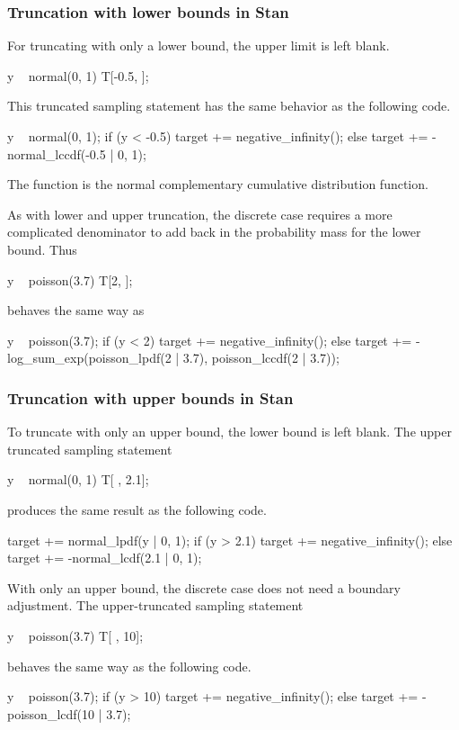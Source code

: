 \subsubsection{Truncation with lower bounds in Stan}

For truncating with only a lower bound, the upper limit is left blank.
%
\begin{stancode}
y ~ normal(0, 1) T[-0.5, ];
\end{stancode}
%
This truncated sampling statement has the same behavior as the
following code.
%
\begin{stancode}
y ~ normal(0, 1);
if (y < -0.5)
  target += negative_infinity();
else
  target += -normal_lccdf(-0.5 | 0, 1);
\end{stancode}
%
The  function is the normal complementary cumulative
distribution function.

As with lower and upper truncation, the discrete case requires a more
complicated denominator to add back in the probability mass for the
lower bound.  Thus
%
\begin{stancode}
y ~ poisson(3.7) T[2, ];
\end{stancode}
%
behaves the same way as
%
\begin{stancode}
y ~ poisson(3.7);
if (y < 2)
  target += negative_infinity();
else
  target += -log_sum_exp(poisson_lpdf(2 | 3.7),
                         poisson_lccdf(2 | 3.7));
\end{stancode}


\subsubsection{Truncation with upper bounds in Stan}

To truncate with only an upper bound, the lower bound is left blank.  
The upper truncated sampling statement
%
\begin{stancode}
y ~ normal(0, 1) T[ , 2.1];
\end{stancode}
%
produces the same result as the following code.
%
\begin{stancode}
target += normal_lpdf(y | 0, 1);
if (y > 2.1)
  target += negative_infinity();
else 
  target += -normal_lcdf(2.1 | 0, 1);
\end{stancode}

With only an upper bound, the discrete case does not need a boundary
adjustment.  The upper-truncated sampling statement
%
\begin{stancode}
y ~ poisson(3.7) T[ , 10];
\end{stancode}
%
behaves the same way as the following code.
%
\begin{stancode}
y ~ poisson(3.7);
if (y > 10)
  target += negative_infinity();
else 
  target += -poisson_lcdf(10 | 3.7);
\end{stancode}

